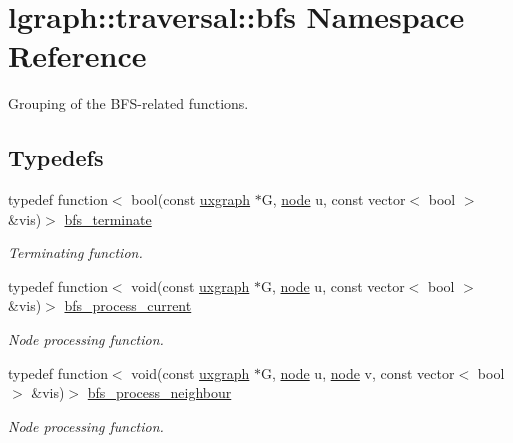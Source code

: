 \hypertarget{namespacelgraph_1_1traversal_1_1bfs}{}\section{lgraph\+:\+:traversal\+:\+:bfs Namespace Reference}
\label{namespacelgraph_1_1traversal_1_1bfs}


Grouping of the B\+F\+S-\/related functions.  


\subsection*{Typedefs}
\begin{DoxyCompactItemize}
\item 
typedef function$<$ bool(const \hyperlink{classlgraph_1_1utils_1_1uxgraph}{uxgraph} $\ast$G, \hyperlink{namespacelgraph_1_1utils_a7bd66ede3805ef121bc2835bd48de0cf}{node} u, const vector$<$ bool $>$ \&vis)$>$ \hyperlink{namespacelgraph_1_1traversal_1_1bfs_a2622d8419e685b0a28b9ad70ca6c1565}{bfs\+\_\+terminate}
\begin{DoxyCompactList}\small\item\em Terminating function. \end{DoxyCompactList}\item 
typedef function$<$ void(const \hyperlink{classlgraph_1_1utils_1_1uxgraph}{uxgraph} $\ast$G, \hyperlink{namespacelgraph_1_1utils_a7bd66ede3805ef121bc2835bd48de0cf}{node} u, const vector$<$ bool $>$ \&vis)$>$ \hyperlink{namespacelgraph_1_1traversal_1_1bfs_a5a37d7fee20d8b473826d3599ada96b7}{bfs\+\_\+process\+\_\+current}
\begin{DoxyCompactList}\small\item\em Node processing function. \end{DoxyCompactList}\item 
typedef function$<$ void(const \hyperlink{classlgraph_1_1utils_1_1uxgraph}{uxgraph} $\ast$G, \hyperlink{namespacelgraph_1_1utils_a7bd66ede3805ef121bc2835bd48de0cf}{node} u, \hyperlink{namespacelgraph_1_1utils_a7bd66ede3805ef121bc2835bd48de0cf}{node} v, const vector$<$ bool $>$ \&vis)$>$ \hyperlink{namespacelgraph_1_1traversal_1_1bfs_ab8c86ff87736f713c845b61ac6a0a956}{bfs\+\_\+process\+\_\+neighbour}
\begin{DoxyCompactList}\small\item\em Node processing function. \end{DoxyCompactList}\end{DoxyCompactItemize}
